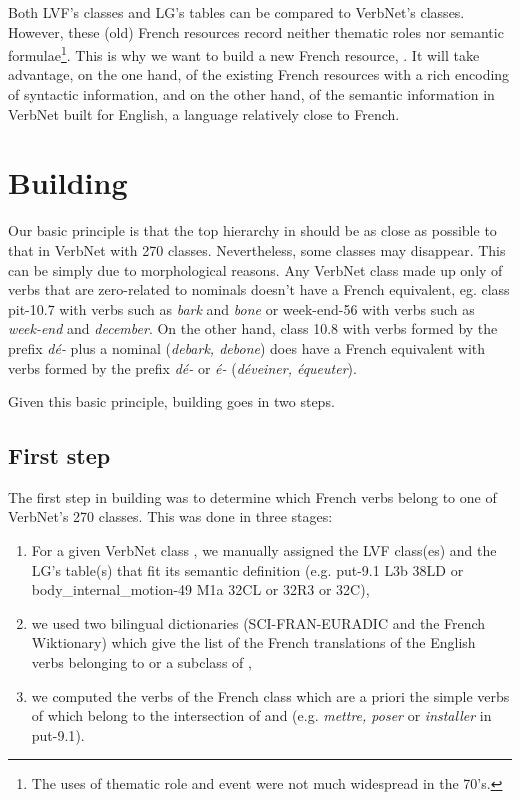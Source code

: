 Both LVF's classes and LG's tables can be compared to VerbNet's classes.
However, these (old) French resources record neither thematic roles nor
semantic formulae\footnote{The uses of thematic role and event were not
much widespread in the 70's.}. This is why we want to build a new French
resource, \verbenet{}. It will take advantage, on the one hand, of the existing
French resources with a rich encoding of syntactic information, and on the
other hand, of the semantic information in VerbNet built for English, a
language relatively close to French.

\section{Building \verbenet{}}

Our basic principle is that the top hierarchy in \verbenet{} should be as close
as possible to that in VerbNet with 270 classes. Nevertheless, some classes may
disappear. This can be simply due to morphological reasons. Any VerbNet class
made up only of verbs that are zero-related to nominals doesn't have a French
equivalent, eg. class pit-10.7 with verbs such as \emph{bark} and \emph{bone}
or week-end-56 with verbs such as \emph{week-end} and \emph{december}. On the
other hand, class 10.8 with verbs formed by the prefix \emph{dé-} plus a
nominal (\emph{debark, debone}) does have a French equivalent with verbs formed
by the prefix \emph{dé-} or \emph{é-} (\emph{déveiner, équeuter}).

Given this basic principle, building \verbenet{} goes in two steps.

\subsection{First step}\label{first}

The first step in building \verbenet{} was to determine which French verbs
belong to one of  VerbNet's 270 classes. This was done in three stages:

\begin{enumerate}

    \item For a given VerbNet class \Ce{}, we  manually assigned the LVF class(es)
    \Clvf{} and the LG's table(s) \Clg{} that fit its semantic definition (e.g.
    {\color{blue}put-9.1} {\color{red}L3b} {\color{green}38LD} or
    {\color{blue}body\_internal\_motion-49} {\color{red}M1a} {\color{green}32CL or
    32R3 or 32C}),

    \item we used two bilingual dictionaries (SCI-FRAN-EURADIC and the French
    Wiktionary) which give the list \Ltrad{} of the French translations of the
    English verbs belonging to \Ce{} or a subclass of \Ce{},

    \item we computed the verbs of the French class \Cf{} which are a priori the
    simple verbs of \Ltrad{} which belong to the intersection of \Clvf{} and \Clg{}
    (e.g. \emph{mettre, poser} or \emph{installer} in {\color{blue}put-9.1}).

\end{enumerate}


